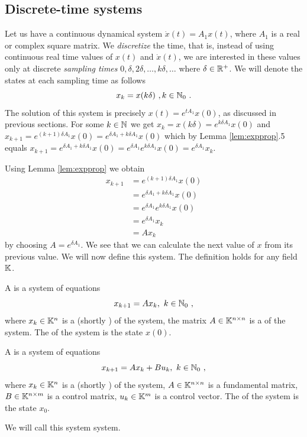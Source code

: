 \subsection{Discrete-time systems}

Let us have a continuous dynamical system $\dot{x}(t)=A_1x(t)$, where $A_1$ is a real or complex square matrix. We \textit{discretize} the time, that is, instead of using continuous real time values of $x(t)$ and $\dot{x}(t)$, we are interested in these values only at discrete \textit{sampling times} $0,\delta,2\delta,\ldots,k\delta,\ldots$ where $\delta\in\mathbb{R}^+$. We will denote the states at each sampling time as follows
$$x_k=x(k\delta)\ ,k\in\mathbb{N}_0\ .$$
The solution of this system is precisely $x(t)=e^{tA_1}x(0)$, as discussed in previous sections. For some $k\in\mathbb{N}$ we get $x_k=x(k\delta)=e^{k\delta A_1}x(0)$ and $x_{k+1}=e^{(k+1)\delta A_1}x(0)=e^{\delta A_1 +k\delta A_1}x(0)$ which by Lemma \ref{lem:expprop}.5 equals $x_{k+1}=e^{\delta A_1 +k\delta A_1}x(0)=e^{\delta A_1}e^{k\delta A_1}x(0)=e^{\delta A_1}x_k$.

Using Lemma \ref{lem:expprop} we obtain 
\begin{align*}
	x_{k+1}
	&=e^{(k+1)\delta A_1}x(0) \\
	&=e^{\delta A_1 +k\delta A_1}x(0) \\
	&=e^{\delta A_1}e^{k\delta A_1}x(0) \\
	&=e^{\delta A_1}x_k \\
	&=Ax_k
\end{align*}
by choosing $A=e^{\delta A_1}$. We see that we can calculate the next value of $x$ from its previous value. We will now define this system. The definition holds for any field $\mathbb{K}$.

\begin{definition}
	A  is a system of equations
	$$x_{k+1}=Ax_k,\ k\in\mathbb{N}_0\ ,$$
	where $x_k\in \mathbb{K}^n$ is a  (shortly ) of the system, the matrix $A\in \mathbb{K}^{n\times n}$ is a  of the system. The  of the system is the state $x(0)$.
\end{definition}

\begin{definition}
	A  is a system of equations
	$$x_{k+1}=Ax_k+Bu_k,\ k\in\mathbb{N}_0\ ,$$
	where $x_k\in\mathbb{K}^n$ is a  (shortly ) of the system, $A\in\mathbb{K}^{n\times n}$ is a fundamental matrix, $B\in\mathbb{K}^{n\times m}$ is a control matrix, $u_k\in\mathbb{K}^m$ is a control vector. The  of the system is the state $x_0$.

	We will call this system  system.
\end{definition}

